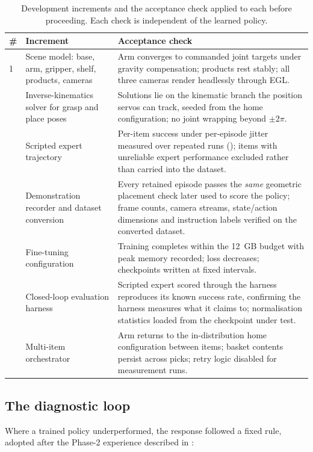 \begin{table}[ht]
\caption{Development increments and the acceptance check applied to each before
proceeding. Each check is independent of the learned policy.}
\begin{center}
\begin{tabular}{p{}p{}p{}}
\toprule
\# & Increment & Acceptance check \\
\midrule
1 & Scene model: base, arm, gripper, shelf, products, cameras &
Arm converges to commanded joint targets under gravity compensation; products rest
stably; all three cameras render headlessly through EGL. \\
\addlinespace
2 & Inverse-kinematics solver for grasp and place poses &
Solutions lie on the kinematic branch the position servos can track, seeded from the
home configuration; no joint wrapping beyond $\pm 2\pi$. \\
\addlinespace
3 & Scripted expert trajectory &
Per-item success under per-episode jitter measured over repeated runs
({tab:grasptune}); items with unreliable expert performance excluded rather
than carried into the dataset. \\
\addlinespace
4 & Demonstration recorder and dataset conversion &
Every retained episode passes the \emph{same} geometric placement check later used to
score the policy; frame counts, camera streams, state/action dimensions and
instruction labels verified on the converted dataset. \\
\addlinespace
5 & Fine-tuning configuration &
Training completes within the \SI{12}{GB} budget with peak memory recorded; loss
decreases; checkpoints written at fixed intervals. \\
\addlinespace
6 & Closed-loop evaluation harness &
Scripted expert scored through the harness reproduces its known success rate,
confirming the harness measures what it claims to; normalisation statistics loaded
from the checkpoint under test. \\
\addlinespace
7 & Multi-item orchestrator &
Arm returns to the in-distribution home configuration between items; basket contents
persist across picks; retry logic disabled for measurement runs. \\
\bottomrule
\end{tabular}
\end{center}
\label{tab:increments}
\end{table}

\subsection{The diagnostic loop}
\label{sec:m-diagnostic-loop}
Where a trained policy underperformed, the response followed a fixed rule, adopted
after the Phase-2 experience described in :

